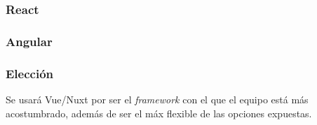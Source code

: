 \subsubsection*{React}

\subsubsection*{Angular}

\subsubsection*{Elección}

Se usará Vue/Nuxt por ser el \textit{framework} con el que el equipo está más acostumbrado, además de ser el máx flexible de las opciones expuestas.